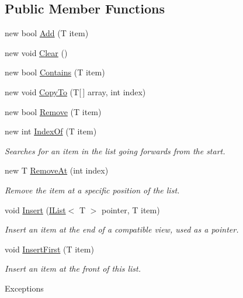 \subsection*{Public Member Functions}
\begin{DoxyCompactItemize}
\item 
new bool \hyperlink{interface_c5_1_1_i_list_a800000d7344d000c1b8c67acda464a3d}{Add} (T item)
\item 
new void \hyperlink{interface_c5_1_1_i_list_aff6179e37b313d34596749484ae58ea4}{Clear} ()
\item 
new bool \hyperlink{interface_c5_1_1_i_list_a108b607b042959d063e1ca77e242406c}{Contains} (T item)
\item 
new void \hyperlink{interface_c5_1_1_i_list_a6fef986271bdc88a6f38cb15bd15690f}{Copy\+To} (T\mbox{[}$\,$\mbox{]} array, int index)
\item 
new bool \hyperlink{interface_c5_1_1_i_list_a14dd6b1e7f06807dc6a45edf0f83dfbd}{Remove} (T item)
\item 
new int \hyperlink{interface_c5_1_1_i_list_a52658ee618f1557622d766d7a348910a}{Index\+Of} (T item)
\begin{DoxyCompactList}\small\item\em Searches for an item in the list going forwards from the start. \end{DoxyCompactList}\item 
new T \hyperlink{interface_c5_1_1_i_list_a9fbcd9c55aae61134321939d0b104cc0}{Remove\+At} (int index)
\begin{DoxyCompactList}\small\item\em Remove the item at a specific position of the list. \end{DoxyCompactList}\item 
void \hyperlink{interface_c5_1_1_i_list_a80df9055583216f4498d3711c9658d1f}{Insert} (\hyperlink{interface_c5_1_1_i_list}{I\+List}$<$ T $>$ pointer, T item)
\begin{DoxyCompactList}\small\item\em Insert an item at the end of a compatible view, used as a pointer. \end{DoxyCompactList}\item 
void \hyperlink{interface_c5_1_1_i_list_a2dd0bf119dee26610ce56283da7d7d11}{Insert\+First} (T item)
\begin{DoxyCompactList}\small\item\em Insert an item at the front of this list. 
\begin{DoxyExceptions}{Exceptions}

\end{DoxyExceptions}
\end{DoxyCompactList}
\end{DoxyCompactItemize}
